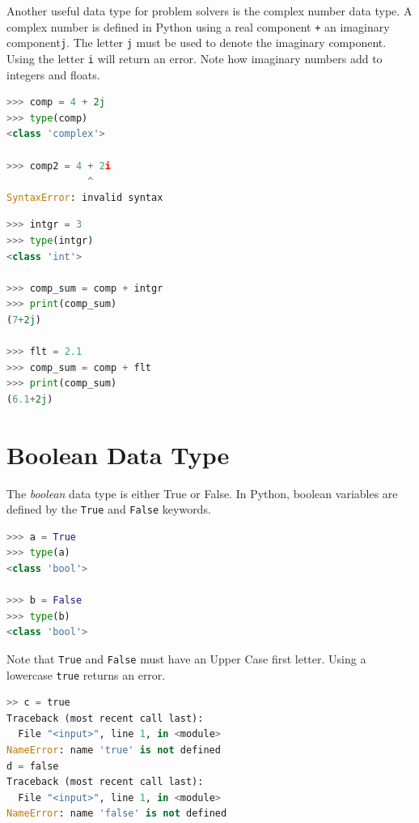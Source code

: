 \documentclass{book}
\begin{document}
Another useful data type for problem solvers is the complex number data
type. A complex number is defined in Python using a real component
\lstinline!+! an imaginary component\lstinline!j!. The letter
\lstinline!j! must be used to denote the imaginary component. Using the
letter \lstinline!i! will return an error. Note how imaginary numbers
add to integers and floats.

\begin{lstlisting}[language=Python]
>>> comp = 4 + 2j
>>> type(comp)
<class 'complex'>

>>> comp2 = 4 + 2i
              ^
SyntaxError: invalid syntax
\end{lstlisting}

\begin{lstlisting}[language=Python]
>>> intgr = 3
>>> type(intgr)
<class 'int'>

>>> comp_sum = comp + intgr
>>> print(comp_sum)
(7+2j)

>>> flt = 2.1
>>> comp_sum = comp + flt
>>> print(comp_sum)
(6.1+2j)
\end{lstlisting}
    




    
        \section{Boolean Data Type}\label{boolean-data-type}
    




    
        The \emph{boolean} data type is either True or False. In Python, boolean
variables are defined by the \lstinline!True! and \lstinline!False!
keywords.

\begin{lstlisting}[language=Python]
>>> a = True
>>> type(a)
<class 'bool'>

>>> b = False
>>> type(b)
<class 'bool'>
\end{lstlisting}

Note that \lstinline!True! and \lstinline!False! must have an Upper Case
first letter. Using a lowercase \lstinline!true! returns an error.

\begin{lstlisting}[language=Python]
>> c = true
Traceback (most recent call last):
  File "<input>", line 1, in <module>
NameError: name 'true' is not defined
d = false
Traceback (most recent call last):
  File "<input>", line 1, in <module>
NameError: name 'false' is not defined
\end{lstlisting}
    
\end{document}

